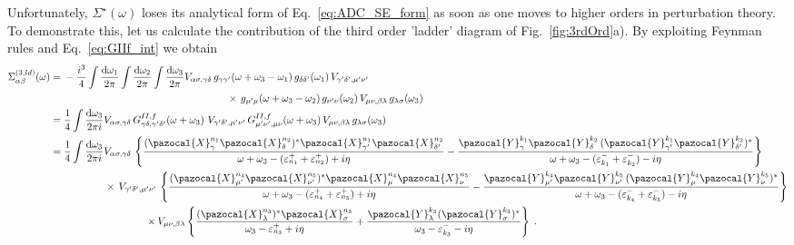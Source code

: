 Unfortunately, $\Sigma^\star(\omega)$ loses its analytical form of Eq.~\eqref{eq:ADC_SE_form} as soon as one moves to higher orders in perturbation theory. To demonstrate this, let us calculate the contribution of the third order 'ladder' diagram of Fig.~\ref{fig:3rdOrd}a). By exploiting Feynman rules
and Eq.~\eqref{eq:GIIf_int} we obtain
\begin{align}
  \Sigma^{(3,ld)}_{\alpha\beta}(\omega)={}& - \frac{i^3}{4} \int \frac{{\rm d}\omega_1}{2\pi} \int \frac{{\rm d}\omega_2}{2\pi} \int \frac{{\rm d}\omega_3}{2\pi} 
  V_{\alpha\sigma,\gamma\delta} 
         \,  g_{\gamma\gamma'}(\omega+\omega_3-\omega_1) \, g_{\delta\delta'}(\omega_1) 
           \, V_{\gamma' \delta', \mu' \nu'}
  \nonumber \\ {}& \qquad \qquad \qquad \qquad \qquad \qquad \qquad \qquad \times
    \,  g_{\mu'\mu}(\omega+\omega_3-\omega_2) \, g_{\nu'\nu}(\omega_2) \, V_{\mu \nu, \beta \lambda} \,  g_{\lambda\sigma}(\omega_3) 
\nonumber \\
  ={}&  \frac{1}{4}  \int \frac{{\rm d}\omega_3}{2\pi i} 
  V_{\alpha\sigma,\gamma\delta} 
         \,  G^{II,f}_{\gamma\delta, \gamma' \delta'}(\omega+\omega_3) \,  
           \, V_{\gamma' \delta', \mu' \nu'}     \,  G^{II,f}_{\mu' \nu', \mu \nu}(\omega+\omega_3) \, V_{\mu \nu, \beta \lambda}  \, g_{\lambda\sigma}(\omega_3) 
\nonumber \\
  ={}&  \frac{1}{4}  \int \frac{{\rm d}\omega_3}{2\pi i} 
    V_{\alpha\sigma,\gamma\delta} \,
  \left\{
    \frac{(\pazocal{X}^{n_1}_\gamma \pazocal{X}^{n_2}_\delta)^*  \pazocal{X}^{n_1}_{\gamma'} \pazocal{X}^{n_2}_{\delta'}}
                      {\omega+\omega_3  - (\varepsilon^+_{n_1}  + \varepsilon^+_{n_2}) + i\eta} 
 -  \frac{ \pazocal{Y}^{k_1}_\gamma \pazocal{Y}^{k_2}_\delta \, ( \pazocal{Y}^{k_1}_{\gamma'} \pazocal{Y}^{k_2}_{\delta'})^*}
                     {\omega+\omega_3  - (\varepsilon^-_{k_1} + \varepsilon^-_{k_2}) - i\eta}
  \right\}
\nonumber \\
  & \qquad \qquad \times    \, V_{\gamma' \delta', \mu' \nu'} \,  \left\{
    \frac{( \pazocal{X}^{n_4}_{\mu'} \pazocal{X}^{n_5}_{\nu'})^*  \pazocal{X}^{n_4}_\mu \pazocal{X}^{n_5}_\nu}
                      {\omega+\omega_3  - (\varepsilon^+_{n_4}  + \varepsilon^+_{n_5}) + i\eta} 
 -  \frac{ \pazocal{Y}^{k_4}_{\mu'} \pazocal{Y}^{k_5}_{\nu'} \, (\pazocal{Y}^{k_4}_\mu \pazocal{Y}^{k_5}_\nu)^*}
                     {\omega+\omega_3  - (\varepsilon^-_{k_4} + \varepsilon^-_{k_5}) - i\eta}
  \right\}
 \nonumber \\
  & \qquad \qquad \qquad \qquad \times   V_{\mu \nu, \beta \lambda}
   \left\{ \frac{(\pazocal{X}^{n_3}_\lambda )^* \pazocal{X}^{n_3}_\sigma}{\omega_3  - \varepsilon^+_{n_3} + i\eta} 
           + \frac{\pazocal{Y}^{k_3}_\lambda  (\pazocal{Y}^{k_3}_\sigma)^*}{\omega_3  - \varepsilon^-_{k_3} - i\eta}  \right\}   \; .
\label{eq:LaddEg1}
 \end{align}
